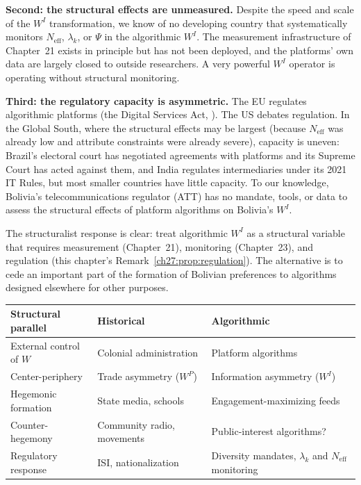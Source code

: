 \documentclass[../structural_economics_book.tex]{subfiles}
\begin{document}
\textbf{Second: the structural effects are unmeasured.} Despite the speed and scale of the $W^I$ transformation, we know of no developing country that systematically monitors $N_{\text{eff}}$, $\lambda_k$, or $\Psi$ in the algorithmic $W^I$. The measurement infrastructure of Chapter~21 exists in principle but has not been deployed, and the platforms' own data are largely closed to outside researchers. A very powerful $W^I$ operator is operating without structural monitoring.

\textbf{Third: the regulatory capacity is asymmetric.} The EU regulates algorithmic platforms (the Digital Services Act, \citeyear{eu2022regulation}). The US debates regulation. In the Global South, where the structural effects may be largest (because $N_{\text{eff}}$ was already low and attribute constraints were already severe), capacity is uneven: Brazil's electoral court has negotiated agreements with platforms and its Supreme Court has acted against them, and India regulates intermediaries under its 2021 IT Rules, but most smaller countries have little capacity. To our knowledge, Bolivia's telecommunications regulator (ATT) has no mandate, tools, or data to assess the structural effects of platform algorithms on Bolivia's $W^I$.

The structuralist response is clear: treat algorithmic $W^I$ as a structural variable that requires measurement (Chapter~21), monitoring (Chapter~23), and regulation (this chapter's Remark~\ref{ch27:prop:regulation}). The alternative is to cede an important part of the formation of Bolivian preferences to algorithms designed elsewhere for other purposes.

\begin{center}
\begin{tabularx}{\textwidth}{LLL}
\toprule
\textbf{Structural parallel} & \textbf{Historical} & \textbf{Algorithmic} \\
\midrule
External control of $W$ & Colonial administration & Platform algorithms \\
Center-periphery & Trade asymmetry ($W^P$) & Information asymmetry ($W^I$) \\
Hegemonic formation & State media, schools & Engagement-maximizing feeds \\
Counter-hegemony & Community radio, movements & Public-interest algorithms? \\
Regulatory response & ISI, nationalization & Diversity mandates, $\lambda_k$ and $N_{\text{eff}}$ monitoring \\
\bottomrule
\end{tabularx}
\end{center}
\end{document}
